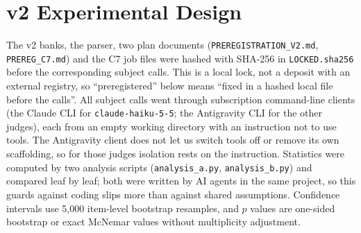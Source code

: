 \documentclass[10pt,twocolumn]{article}
\begin{document}
\section{v2 Experimental Design}
\label{sec:design}
The v2 banks, the parser, two plan documents (\texttt{PREREGISTRATION\_V2.md}, \texttt{PREREG\_C7.md}) and the C7 job files were hashed with SHA-256 in \texttt{LOCKED.sha256} before the corresponding subject calls. This is a local lock, not a deposit with an external registry, so ``preregistered'' below means ``fixed in a hashed local file before the calls''. All subject calls went through subscription command-line clients (the Claude CLI for \texttt{claude-haiku-5-5}; the Antigravity CLI for the other judges), each from an empty working directory with an instruction not to use tools. The Antigravity client does not let us switch tools off or remove its own scaffolding, so for those judges isolation rests on the instruction. Statistics were computed by two analysis scripts (\texttt{analysis\_a.py}, \texttt{analysis\_b.py}) and compared leaf by leaf; both were written by AI agents in the same project, so this guards against coding slips more than against shared assumptions. Confidence intervals use 5,000 item-level bootstrap resamples, and $p$ values are one-sided bootstrap or exact McNemar values without multiplicity adjustment.
\end{document}
